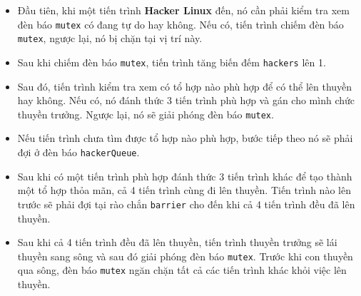 \begin{itemize}
	\item Đầu tiên, khi một tiến trình {\sf\bfseries Hacker Linux} đến, nó cần phải kiểm tra xem đèn báo {\tt mutex} có đang tự do hay không. Nếu có, tiến trình chiếm đèn báo {\tt mutex}, ngược lại, nó bị chặn tại vị trí này.
	\item Sau khi chiếm đèn báo {\tt mutex}, tiến trình tăng biến đếm {\tt hackers} lên 1.
	\item Sau đó, tiến trình kiểm tra xem có tổ hợp nào phù hợp để có thể lên thuyền hay không. Nếu có, nó đánh thức 3 tiến trình phù hợp và gán cho mình chức thuyền trưởng. Ngược lại, nó sẽ giải phóng đèn báo {\tt mutex}.
	\item Nếu tiến trình chưa tìm được tổ hợp nào phù hợp, bước tiếp theo nó sẽ phải đợi ở đèn báo {\tt hackerQueue}. 
	\item Sau khi có một tiến trình phù hợp đánh thức 3 tiến trình khác để tạo thành một tổ hợp thỏa mãn, cả 4 tiến trình cùng đi lên thuyền. Tiến trình nào lên trước sẽ phải đợi tại rào chắn {\tt barrier} cho đến khi cả 4 tiến trình đều đã lên thuyền.
	\item Sau khi cả 4 tiến trình đều đã lên thuyền, tiến trình thuyền trưởng sẽ lái thuyền sang sông và sau đó giải phóng đèn báo {\tt mutex}. Trước khi con thuyền qua sông, đèn báo {\tt mutex} ngăn chặn tất cả các tiến trình khác khỏi việc lên thuyền.
\end{itemize}